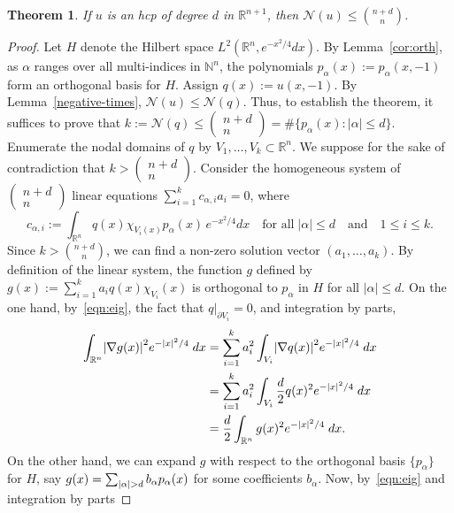 \documentclass[10pt]{amsart}
\newtheorem{theo}{Theorem}[section]
\theoremstyle{definition}\newtheorem{defi}[theo]{Definition}\newtheorem{rema}[theo]{Remark}\newtheorem{exam}[theo]{Example}\newtheorem{exem}[theo]{Example}\newtheorem{nota}[theo]{Notation}
\newcommand{\N}{\mathbb{N}}
\newcommand{\R}{\mathbb{R}}
\newcommand{\abs}[1]{\left \lvert #1 \right \rvert}
\newcommand{\nodal}{\mathcal{N}}
\let\originalleft\left
\let\originalright\right
\renewcommand{\left}{\mathopen{}\mathclose\bgroup\originalleft}
\renewcommand{\right}{\aftergroup\egroup\originalright}
\begin{document}
\begin{theo}\label{thm:courant}
If $u$ is an hcp of degree $d$ in $\R^{n+1}$, then $\nodal(u) \le \binom{n+d}{n}$.
\end{theo}

\begin{proof}
Let $H$ denote the Hilbert space $L^2(\R^n,e^{-x^2/4}dx)$. By Lemma~\ref{cor:orth}, as $\alpha$ ranges over all multi-indices in $\N^n$, the polynomials $p_\alpha(x):=p_\alpha(x,-1)$ form an orthogonal basis for $H$. Assign $q(x):=u(x,-1)$. By Lemma~\ref{negative-times}, $\nodal(u)\leq\nodal(q)$. Thus, to establish the theorem, it suffices to prove that $k:=\nodal(q)\leq (
\begin{smallmatrix}n+d\\n
\end{smallmatrix})=\#\{p_\alpha(x):|\alpha|\leq d\}$. Enumerate the nodal domains of $q$ by $V_1, \dots, V_k \subset \R^n$. We suppose for the sake of contradiction that $k>(
\begin{smallmatrix}n+d\\n
\end{smallmatrix})$. Consider the homogeneous system of $(
\begin{smallmatrix}n+d\\n
\end{smallmatrix})$ linear equations $\sum_{i=1}^k c_{\alpha,i}a_i=0$, where
\[
c_{\alpha,i}:=\int_{\R^n} q(x)\chi_{V_i(x)} p_\alpha(x)\,e^{-x^2/4}dx\quad\text{for all} \;|\alpha|\leq d\quad \text{and} \quad 1\leq i\leq k.
\]
Since $k>\binom{n+d}{n}$, we can find a non-zero solution vector $(a_1,\dots,a_k)$. By definition of the linear system, the function $g$ defined by $g(x):=\sum_{i=1}^k a_iq(x)\chi_{V_i}(x)$ is orthogonal to $p_\alpha$ in $H$ for all $|\alpha|\leq d$. On the one hand, by~\eqref{eqn:eig}, {the fact that $q|_{\partial V_i} = 0$}, and integration by parts,
\begin{equation}\label{eqn:eigp}
\begin{aligned}[t]
\int_{\R^n} \abs{\nabla g(x)}^2 e^{-\abs{x}^2/4} \; dx &= \sum_{i=1}^k a_i^2 \int_{V_i} \abs{\nabla q(x)}^2 e^{-\abs{x}^2/4} \; dx\\
&= \sum_{i=1}^k a_i^2 \int_{V_i} \frac{d}{2} q(x)^2 e^{-\abs{x}^2/4} \; dx\\
&= \frac{d}{2} \int_{\R^n} g(x)^2 e^{-\abs{x}^2/4} \; dx.
\end{aligned}
\end{equation}
On the other hand, we can expand $g$ with respect to the orthogonal basis $\{p_\alpha\}$ for $H$, say $g(x) = \sum_{\abs{\alpha} > d} b_\alpha p_\alpha(x)$ for some coefficients $b_\alpha$. Now, by~\eqref{eqn:eig} and integration by parts

\end{proof}
\end{document}
